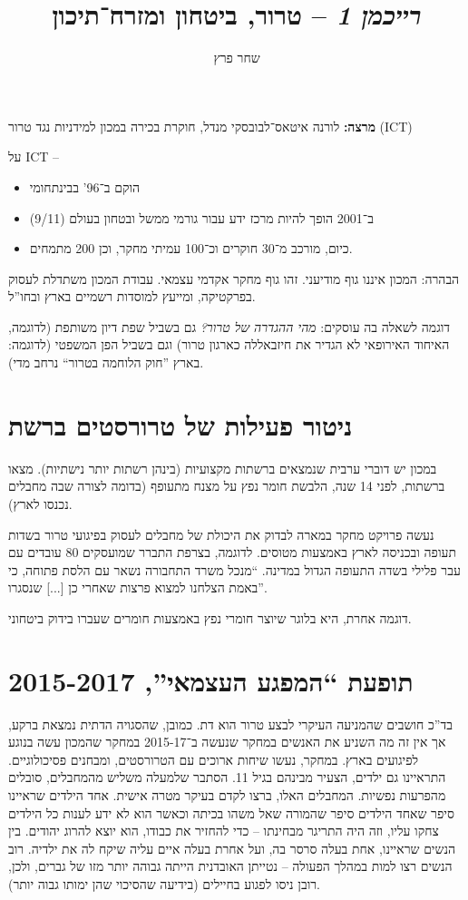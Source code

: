 \documentclass[]{article}
\author{שחר פרץ}
\title{\textit{רייכמן 1} – טרור, ביטחון ומזרח־תיכון}
\begin{document}
	\maketitle
	\textbf{מרצה: }לורנה איטאס־לבובסקי מנדל, חוקרת בכירה במכון למידניות נגד טרור (ICT)
	
	על ICT – 
	\begin{itemize}
		\item הוקם ב־96' בבינתחומי
		\item ב־2001 הופך להיות מרכז ידע עבור גורמי ממשל ובטחון בעולם (9/11)
		\item כיום, מורכב מ־30 חוקרים וכ־100 עמיתי מחקר, וכן 200 מתמחים. 
	\end{itemize}
	הבהרה: המכון איננו גוף מודיעני. זהו גוף מחקר אקדמי עצמאי. עבודת המכון משתדלת לעסוק בפרקטיקה, ומייעץ למוסדות רשמיים בארץ ובחו''ל. 
	
	דוגמה לשאלה בה עוסקים: \textit{מהי ההגדרה של טרור?} גם בשביל שפת דיון משותפת (לדוגמה, האיחוד האירופאי לא הגדיר את חיזבאללה כארגון טרור) וגם בשביל הפן המשפטי (לדוגמה: בארץ ''חוק הלוחמה בטרור`` נרחב מדי). 
	
	\section{ניטור פעילות של טרורסטים ברשת}
	במכון יש דוברי ערבית שנמצאים ברשתות מקצועיות (בינהן רשתות יותר נישתיות). מצאו ברשתות, לפני 14 שנה, הלבשת חומר נפץ על מצנח מתעופף (בדומה לצורה שבה מחבלים נכנסו לארץ).  
	
	נעשה פרויקט מחקר במארה לבדוק את היכולת של מחבלים לעסוק בפיגועי טרור בשדות תעופה ובכניסה לארץ באמצעות מטוסים. לדוגמה, בצרפת התברר שמועסקים 80 עובדים עם עבר פלילי בשדה התעופה הגדול במדינה. ``מנכל משרד התחבורה נשאר עם הלסת פתוחה, כי באמת הצלחנו למצוא פרצות שאחרי כן [...]  שנסגרו''. 
	
	דוגמה אחרת, היא בלוגר שיוצר חומרי נפץ באמצעות חומרים שעברו בידוק ביטחוני. 
	
	\section{תופעת ``המפגע העצמאי'', 2015-2017}
	בד''כ חושבים שהמניעה העיקרי לבצע טרור הוא דת. כמובן, שהסגויה הדתית נמצאת ברקע, אך אין זה מה השניע את האנשים במחקר שנעשה ב־2015-17 במחקר שהמכון עשה בנוגע לפיגועים בארץ. במחקר, נעשו שיחות ארוכים עם הטרורסטים, ומבחנים פסיכולוגיים. התראיינו גם ילדים, הצעיר מבינהם בגיל 11. הסתבר שלמעלה משליש מהמחבלים, סובלים מהפרעות נפשיות. המחבלים האלו, ברצו לקדם בעיקר מטרה אישית. אחד הילדים שראיינו סיפר שאחד הילדים סיפר שהמורה שאל משהו בכיתה וכאשר הוא לא ידע לענות כל הילדים צחקו עליו, וזה היה התריגר מבחינתו – כדי להחזיר את כבודו, הוא יוצא להרוג יהודים. בין הנשים שראיינו, אחת בעלה סרסר בה, ועל אחרת בעלה איים עליה שיקח לה את ילדיה. רוב הנשים רצו למות במהלך הפעולה – נטייתן האובדנית הייתה גבוהה יותר מזו של גברים, ולכן, רובן ניסו לפגוע בחיילים (בידיעה שהסיכוי שהן ימותו גבוה יותר). 
	
\end{document}
